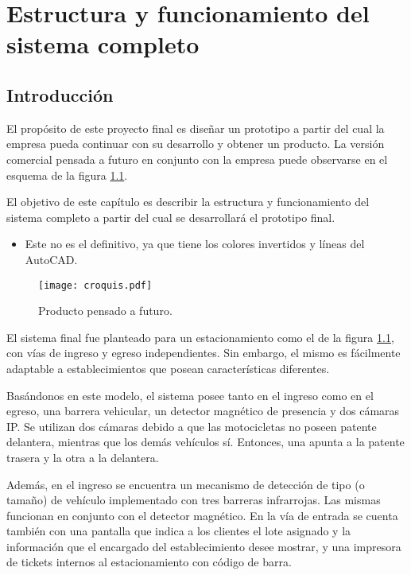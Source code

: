 \chapter{Estructura y funcionamiento del sistema completo}  \label{cap:estructura sist}

\section{Introducción}
El propósito de este proyecto final es diseñar un prototipo a partir del cual la empresa pueda continuar con su desarrollo y obtener un producto. La versión comercial pensada a futuro en conjunto con la empresa puede observarse en el esquema de la figura \ref{fig:img_croquis-est}.

El objetivo de este capítulo es describir la estructura y funcionamiento del sistema completo a partir del cual se desarrollará el prototipo final.

\begin{itemize}
	\item \textcolor{mGreen}{Este no es el definitivo, ya que tiene los colores invertidos y líneas del AutoCAD.}
	\end{itemize}

\begin{figure}[H]
	\centering
	\texttt{[image: croquis.pdf]}
	\caption{Producto pensado a futuro.}
	\label{fig:img_croquis-est}
\end{figure}

El sistema final fue planteado para un estacionamiento como el de la figura \ref{fig:img_croquis-est}, con vías de ingreso y egreso independientes. Sin embargo, el mismo es fácilmente adaptable a establecimientos que posean características diferentes. 

Basándonos en este modelo, el sistema posee tanto en el ingreso como en el egreso, una barrera vehicular, un detector magnético de presencia y dos cámaras IP.  Se utilizan dos cámaras debido a que las motocicletas no poseen patente delantera, mientras que los demás vehículos sí. Entonces, una apunta a la patente trasera y la otra a la delantera.

Además, en el ingreso se encuentra un mecanismo de detección de tipo (o tamaño) de vehículo implementado con tres barreras infrarrojas. Las mismas funcionan en conjunto con el detector magnético. En la vía de entrada se cuenta también con una pantalla que indica a los clientes el lote asignado y la información que el encargado del establecimiento desee mostrar, y una impresora de tickets internos al estacionamiento con código de barra.

